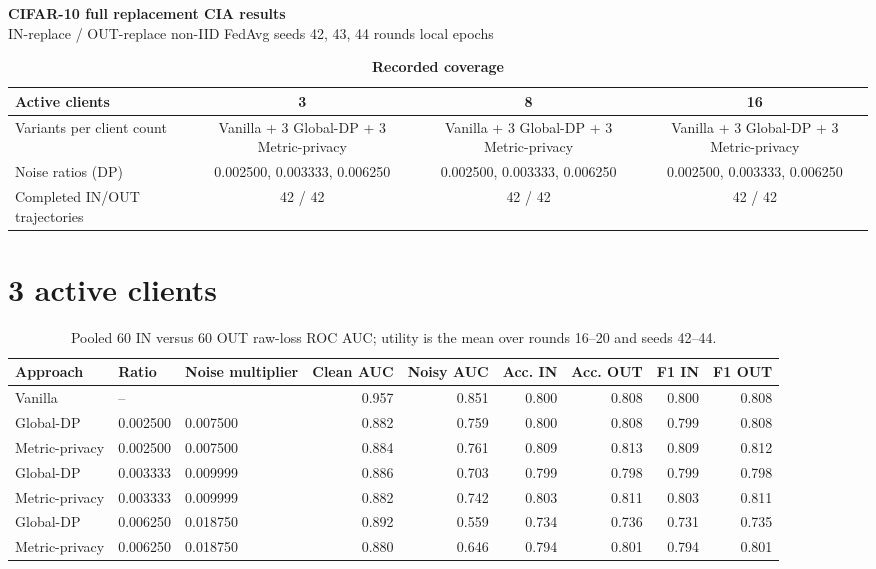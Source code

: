 \documentclass[10pt,a4paper,landscape]{article}
\begin{document}
\begin{center}
{\LARGE\bfseries CIFAR-10 full replacement CIA results}\\[4pt]
{\small IN-replace / OUT-replace \quad non-IID \quad FedAvg \quad seeds 42, 43, 44  rounds  local epochs}
\end{center}
\begin{table}[h]
\centering
\caption*{\bfseries Recorded coverage}
\begin{tabular}{lccc}
\toprule
Active clients & 3 & 8 & 16 \\
\midrule
Variants per client count & Vanilla + 3 Global-DP + 3 Metric-privacy & Vanilla + 3 Global-DP + 3 Metric-privacy & Vanilla + 3 Global-DP + 3 Metric-privacy \\
Noise ratios (DP) & 0.002500, 0.003333, 0.006250 & 0.002500, 0.003333, 0.006250 & 0.002500, 0.003333, 0.006250 \\
Completed IN/OUT trajectories & 42 / 42 & 42 / 42 & 42 / 42 \\
\bottomrule
\end{tabular}
\end{table}
\section*{3 active clients}
\begin{table}[h]
\centering
\caption{Pooled 60 IN versus 60 OUT raw-loss ROC AUC; utility is the mean over rounds 16--20 and seeds 42--44.}
\begin{tabular}{lllrrrrrr}
\toprule
Approach & Ratio & Noise multiplier & Clean AUC & Noisy AUC & Acc. IN & Acc. OUT & F1 IN & F1 OUT \\
\midrule
Vanilla & -- &  & 0.957 & 0.851 & 0.800 & 0.808 & 0.800 & 0.808 \\
Global-DP & 0.002500 & 0.007500 & 0.882 & 0.759 & 0.800 & 0.808 & 0.799 & 0.808 \\
Metric-privacy & 0.002500 & 0.007500 & 0.884 & 0.761 & 0.809 & 0.813 & 0.809 & 0.812 \\
Global-DP & 0.003333 & 0.009999 & 0.886 & 0.703 & 0.799 & 0.798 & 0.799 & 0.798 \\
Metric-privacy & 0.003333 & 0.009999 & 0.882 & 0.742 & 0.803 & 0.811 & 0.803 & 0.811 \\
Global-DP & 0.006250 & 0.018750 & 0.892 & 0.559 & 0.734 & 0.736 & 0.731 & 0.735 \\
Metric-privacy & 0.006250 & 0.018750 & 0.880 & 0.646 & 0.794 & 0.801 & 0.794 & 0.801 \\
\bottomrule
\end{tabular}
\end{table}
\clearpage
\end{document}
